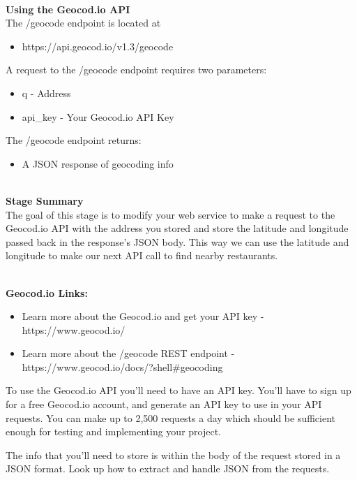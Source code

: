\documentclass{article}
\begin{document}
\-\ \\
\textbf{Using the Geocod.io API}\\
The /geocode endpoint is located at
\begin{itemize}
\item https://api.geocod.io/v1.3/geocode
\end{itemize}
A request to the /geocode endpoint requires two parameters:
\begin{itemize}
\item q - Address
\item api\_key - Your Geocod.io API Key
\end{itemize}
The /geocode endpoint returns:
\begin{itemize}
\item A JSON response of geocoding info
\end{itemize}

\-\ \\
\textbf{Stage Summary}\\
The goal of this stage is to modify your web service to make a request to the Geocod.io API with the address you stored and store the latitude and longitude passed back in the response's JSON body. This way we can use the latitude and longitude to make our next API call to find nearby restaurants. 

\-\ \\
\textbf{Geocod.io Links:}
\begin{itemize}
\item  Learn more about the Geocod.io and get your API key - https://www.geocod.io/
\item Learn more about the /geocode REST endpoint - https://www.geocod.io/docs/?shell\#geocoding
\end{itemize}

\begin{info}
To use the Geocod.io API you'll need to have an API key. You'll have to sign up for a free Geocod.io account, and generate an API key to use in your API requests. You can make up to 2,500 requests a day which should be sufficient enough for testing and implementing your project. 
\end{info}

\begin{info}
The info that you'll need to store is within the body of the request stored in a JSON format. Look up how to extract and handle JSON from the requests.
\end{info}
\end{document}
